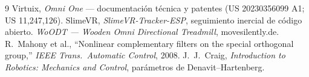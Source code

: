 \documentclass[10pt,twocolumn]{article}
\begin{document}
\begin{thebibliography}{9}
\small
{} Virtuix, \emph{Omni One} --- documentaci\'on t\'ecnica y patentes
(US 20230356099 A1; US 11,247,126).
 SlimeVR, \emph{SlimeVR-Tracker-ESP}, seguimiento inercial de c\'odigo abierto.
 \emph{WoODT --- Wooden Omni Directional Treadmill}, movesilently.de.
 R.\ Mahony et al., ``Nonlinear complementary filters on the special
orthogonal group,'' \emph{IEEE Trans.\ Automatic Control}, 2008.
 J.\ J.\ Craig, \emph{Introduction to Robotics: Mechanics and Control},
par\'ametros de Denavit--Hartenberg.
\end{thebibliography}
\end{document}
